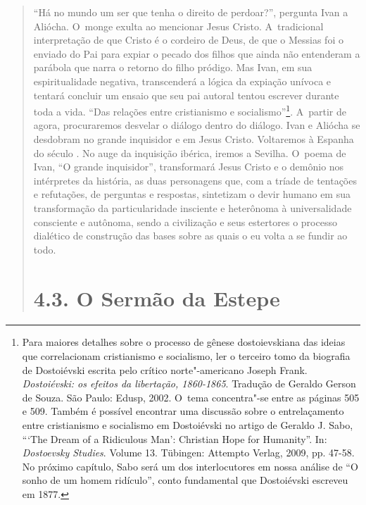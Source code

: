 {\begin{quote}
``Há no mundo um ser que tenha o direito de perdoar?'', pergunta Ivan a
Aliócha. O~monge exulta ao mencionar Jesus Cristo. A~tradicional
interpretação de que Cristo é o cordeiro de Deus, de que o Messias foi o
enviado do Pai para expiar o pecado dos filhos que ainda não entenderam
a parábola que narra o retorno do filho pródigo. Mas Ivan, em sua
espiritualidade negativa, transcenderá a lógica da expiação unívoca e
tentará concluir um ensaio que seu pai autoral tentou escrever durante
toda a vida. ``Das relações entre cristianismo e socialismo''\footnote{Para
  maiores detalhes sobre o processo de gênese dostoievskiana das ideias
  que correlacionam cristianismo e socialismo, ler o terceiro tomo da
  biografia de Dostoiévski escrita pelo crítico norte"-americano Joseph
  Frank. \emph{Dostoiévski: os efeitos da libertação, 1860-1865}.
  Tradução de Geraldo Gerson de Souza. São Paulo: Edusp, 2002. O~tema
  concentra"-se entre as páginas 505 e 509. Também é possível encontrar
  uma discussão sobre o entrelaçamento entre cristianismo e socialismo
  em Dostoiévski no artigo de Geraldo J. Sabo, ```The Dream of a
  Ridiculous Man': Christian Hope for Humanity''. In: \emph{Dostoevsky
  Studies}. Volume 13. Tübingen: Attempto Verlag, 2009, pp. 47-58. No
  próximo capítulo, Sabo será um dos interlocutores em nossa análise de
  ``O sonho de um homem ridículo'', conto fundamental que Dostoiévski
  escreveu em 1877.}. A~partir de agora, procuraremos desvelar o diálogo
dentro do diálogo. Ivan e Aliócha se desdobram no grande inquisidor e em
Jesus Cristo. Voltaremos à Espanha do século . No auge da inquisição
ibérica, iremos a Sevilha. O~poema de Ivan, ``O grande inquisidor'',
transformará Jesus Cristo e o demônio nos intérpretes da história, as
duas personagens que, com a tríade de tentações e refutações, de
perguntas e respostas, sintetizam o devir humano em sua transformação da
particularidade insciente e heterônoma à universalidade consciente e
autônoma, sendo a civilização e seus estertores o processo dialético de
construção das bases sobre as quais o eu volta a se fundir ao todo.

\section{4.3. O Sermão da Estepe}


\end{quote}}
